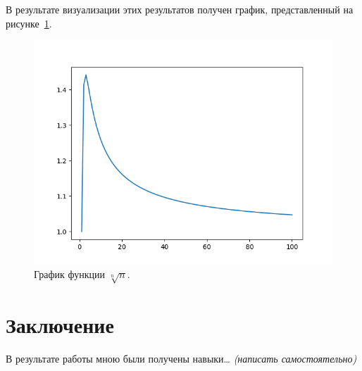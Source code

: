 \documentclass[labwork]{fefudoc}
\begin{document}
В результате визуализации этих результатов получен график, представленный на рисунке~\ref{график}.
\begin{figure}
\centering
\includegraphics{labplot}
\caption{График функции $\sqrt[n]{n}$.}
\label{график}
\end{figure}

\section*{Заключение}
В результате работы мною были получены навыки\dots{} \textit{(написать самостоятельно)}
\end{document}
